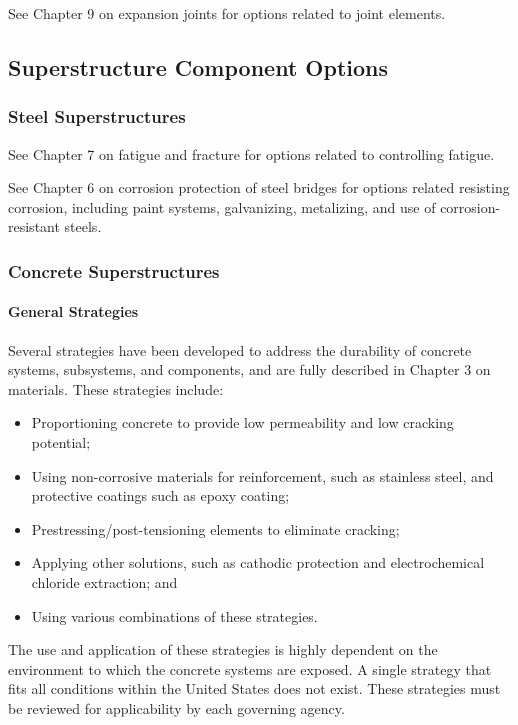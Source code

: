 See Chapter 9 on expansion joints for options related to joint elements.

\subsection{Superstructure Component Options}
\subsubsection{Steel Superstructures}
See Chapter 7 on fatigue and fracture for options related to controlling fatigue.

See Chapter 6 on corrosion protection of steel bridges for options related resisting corrosion, including paint systems, galvanizing, metalizing, and use of corrosion-resistant steels.

\subsubsection{Concrete Superstructures}
\paragraph{General Strategies}
Several strategies have been developed to address the durability of concrete systems, subsystems, and
components, and are fully described in Chapter 3 on materials. These strategies include:
\begin{itemize}
  \item Proportioning concrete to provide low permeability and low cracking potential;
  \item Using non-corrosive materials for reinforcement, such as stainless steel, and protective coatings such as
  epoxy coating;
  \item  Prestressing/post-tensioning elements to eliminate cracking;
  \item Applying other solutions, such as cathodic protection and electrochemical chloride extraction; and
  \item Using various combinations of these strategies.
\end{itemize}

The use and application of these strategies is highly dependent on the environment to which the concrete systems
are exposed. A single strategy that fits all conditions within the United States does not exist. These strategies must be
reviewed for applicability by each governing agency.

